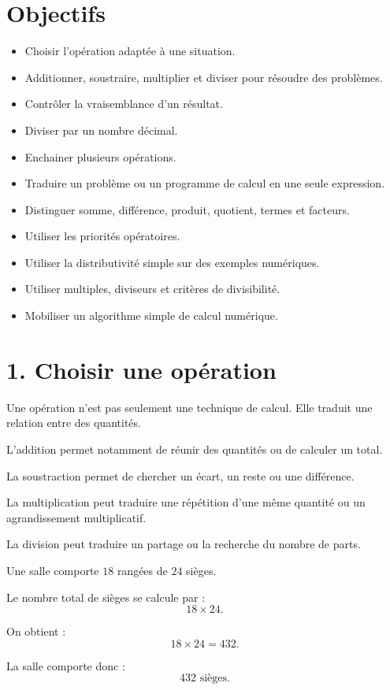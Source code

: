 
\section{Objectifs}

\begin{itemize}
\item Choisir l'opération adaptée à une situation.
\item Additionner, soustraire, multiplier et diviser pour résoudre des problèmes.
\item Contrôler la vraisemblance d'un résultat.
\item Diviser par un nombre décimal.
\item Enchainer plusieurs opérations.
\item Traduire un problème ou un programme de calcul en une seule expression.
\item Distinguer somme, différence, produit, quotient, termes et facteurs.
\item Utiliser les priorités opératoires.
\item Utiliser la distributivité simple sur des exemples numériques.
\item Utiliser multiples, diviseurs et critères de divisibilité.
\item Mobiliser un algorithme simple de calcul numérique.
\end{itemize}

\section{1. Choisir une opération}

Une opération n'est pas seulement une technique de calcul. Elle traduit une relation entre des quantités.

L'addition permet notamment de réunir des quantités ou de calculer un total.

La soustraction permet de chercher un écart, un reste ou une différence.

La multiplication peut traduire une répétition d'une même quantité ou un agrandissement multiplicatif.

La division peut traduire un partage ou la recherche du nombre de parts.

\begin{exemple}
Une salle comporte $18$ rangées de $24$ sièges.

Le nombre total de sièges se calcule par :
\[
18\times24.
\]

On obtient :
\[
18\times24=432.
\]

La salle comporte donc :
\[
\boxed{432\text{ sièges}}.
\]
\end{exemple}


